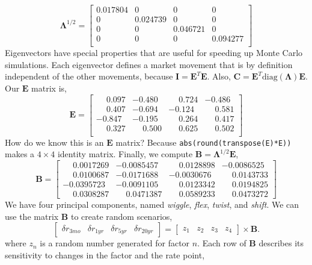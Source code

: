 \[
\mathbf{\Lambda}^{1/2}=
\begin{bmatrix}
	0.017804 & 0 & 0 &  0 \\
	0 & 0.024739 & 0 &  0 \\
	0 & 0 & 0.046721 & 0 \\
	0 & 0 & 0 & 0.094277 \\
\end{bmatrix}
\]
Eigenvectors have special properties that are useful for speeding up Monte Carlo simulations. Each eigenvector defines a market movement that is by definition independent of the other movements, because $\mathbf{I}=\mathbf{E}^T\mathbf{E}$. Also, $\mathbf{C}=\mathbf{E}^T \text{diag}(\mathbf{\Lambda}) \mathbf{E}$. Our $\mathbf{E}$ matrix is,
\[
\mathbf{E}=
\begin{bmatrix}
	\phantom{-}0.097 & -0.480 & \phantom{-}0.724 & -0.486 \\
	\phantom{-}0.407 & -0.694 & -0.124 & \phantom{-}0.581 \\
	-0.847 & -0.195 & \phantom{-}0.264 & \phantom{-}0.417 \\
	\phantom{-}0.327 & \phantom{-}0.500 & \phantom{-}0.625 & \phantom{-}0.502 \\
\end{bmatrix}
\]
How do we know this is an $\mathbf{E}$ matrix? Because \texttt{abs(round(transpose(E)*E))} makes a $4 \times 4$ identity matrix. Finally, we compute $\mathbf{B}=\mathbf{\Lambda}^{1/2} \mathbf{E}$,
\[
\mathbf{B}=
\begin{bmatrix}
	\phantom{-}0.0017269 & -0.0085457 & \phantom{-}0.0128898 & -0.0086525 \\
	\phantom{-}0.0100687 & -0.0171688 & -0.0030676 & \phantom{-}0.0143733 \\
	-0.0395723 & -0.0091105 & \phantom{-}0.0123342 & \phantom{-}0.0194825 \\
	\phantom{-}0.0308287 & \phantom{-}0.0471387 & \phantom{-}0.0589233 & \phantom{-}0.0473272
\end{bmatrix}
\]
We have four principal components, named \emph{wiggle}, \emph{flex}, \emph{twist}, and \emph{shift}. We can use the matrix $\mathbf{B}$ to create random scenarios,
\[
\begin{bmatrix}
\delta r_{3mo} & \delta r_{1yr} & \delta r_{5yr} & \delta r_{20yr}
\end{bmatrix}
=
\begin{bmatrix}
z_1 & z_2 & z_3 & z_4
\end{bmatrix}
\times \mathbf{B}.
\]
where $z_n$ is a random number generated for factor $n$. Each row of $\mathbf{B}$ describes its sensitivity to changes in the factor and the rate point,
